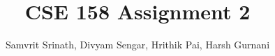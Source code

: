 \documentclass[12pt,twocolumn]{article}
\begin{document}
\title{CSE 158 Assignment 2}
\author{Samvrit Srinath, Divyam Sengar, Hrithik Pai, Harsh Gurnani}
\date{}
\maketitle
\end{document}
